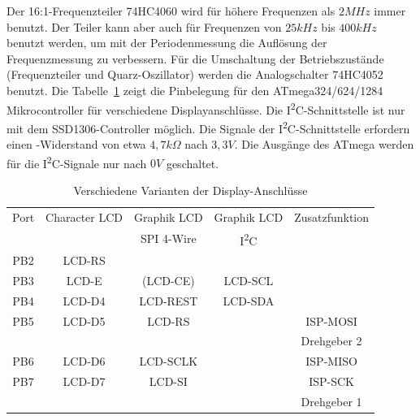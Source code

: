 Der 16:1-Frequenzteiler 74HC4060 wird für höhere Frequenzen als \(2MHz\) immer benutzt.
Der Teiler kann aber auch für Frequenzen von \(25kHz\) bis \(400kHz\) benutzt werden, um mit der
Periodenmessung die Auflösung der Frequenzmessung zu verbessern.
Für die Umschaltung der Betriebszustände (Frequenzteiler und Quarz-Oszillator) werden
die Analogschalter 74HC4052 benutzt.
Die Tabelle~\ref{tab:mega644-display} zeigt die Pinbelegung für den ATmega324/624/1284 Mikrocontroller für verschiedene Displayanschlüsse.
Die I\textsuperscript{2}C-Schnittstelle ist nur mit dem SSD1306-Controller möglich.
Die Signale der I\textsuperscript{2}C-Schnittstelle erfordern einen -Widerstand von etwa \(4,7k\Omega\) nach \(3,3V\).
Die Ausgänge des ATmega werden für die I\textsuperscript{2}C-Signale nur nach \(0V\) geschaltet.


\begin{table}[H]
  \begin{center}
    \begin{tabular}{| c || c | c | c | c |}
    \hline
      Port & Character LCD &  Graphik LCD & Graphik LCD  & Zusatzfunktion      \\
           &               &  SPI 4-Wire  &  I\textsuperscript{2}C         &                     \\
    \hline
    \hline
    PB2    &  LCD-RS         &            &             &       \\
    \hline
    PB3    &  LCD-E          & (LCD-CE)   &  LCD-SCL    &       \\
    \hline
    PB4    &  LCD-D4         & LCD-REST   &  LCD-SDA    &       \\
    \hline
    PB5    &  LCD-D5         & LCD-RS     &             & ISP-MOSI \\
           &                 &            &             & Drehgeber 2 \\
    \hline
    PB6    &  LCD-D6         & LCD-SCLK   &             & ISP-MISO \\
    \hline
    PB7    &  LCD-D7         & LCD-SI     &             & ISP-SCK  \\
           &                 &            &             & Drehgeber 1 \\
    \hline
    \end{tabular}
  \end{center}
  \caption{Verschiedene Varianten der Display-Anschlüsse}
\label{tab:mega644-display}
\end{table}


